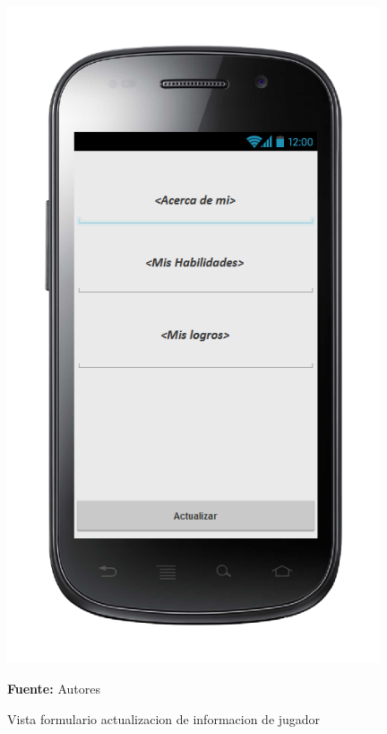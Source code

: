 \begin{figure}[!htb]
  \begin{center}
\includegraphics[width=11cm]{./imagenes/UI/Usuarios/formulario_actualizacion_de_informacion_de_jugador.png}
    \caption{Vista formulario actualizacion de informacion de jugador}
    \label{fig:Vista_formulario_actualizacion_de_informacion_de_jugador}
    \textbf{Fuente:}  Autores
  \end{center}
\end{figure}
